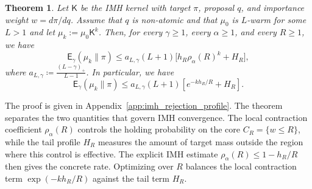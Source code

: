\documentclass[10pt, journal]{IEEEtran}
\newcommand{\sK}{\mathsf{K}}
\newtheorem{theorem}{Theorem}
\begin{document}
\begin{theorem}\label{thm:imh-hs-rejection-profile}
Let $\sK$ be the IMH kernel with target $\pi$, proposal $q$, and importance weight $w=d\pi/dq$. Assume that $q$ is non-atomic and that $\mu_0$ is $L$-warm for some $L>1$ and let $\mu_k:=\mu_0\sK^k$.
Then, for every $\gamma\ge 1$, every $\alpha\ge 1$, and every $R\ge 1$, we have 
\begin{equation}\label{eq:mainthm}
    \mathsf E_\gamma(\mu_k\|\pi)\le a_{L,\gamma}(L+1)\Big[h_R\rho_\alpha(R)^k+H_R\Big],
\end{equation}
where $a_{L,\gamma}\coloneqq \frac{(L-\gamma)_+}{L-1}$. In particular, we have 
$$\mathsf E_\gamma(\mu_k\|\pi)\le a_{L,\gamma}(L+1)\left[e^{-kh_R/R}+H_R\right].$$
\end{theorem}


The proof is given in Appendix~\ref{app:imh_rejection_profile}. The theorem separates the two quantities that govern IMH convergence. The local contraction coefficient $\rho_\alpha(R)$ controls the holding probability on the core $C_R=\{w\le R\}$, while the tail profile $H_R$ measures the amount of target mass outside the region where this control is effective. The explicit IMH estimate $\rho_\alpha(R)\le 1-h_R/R$ then gives the concrete rate. Optimizing over $R$ balances the local contraction term $\exp(-kh_R/R)$ against the tail term $H_R$.
\end{document}
